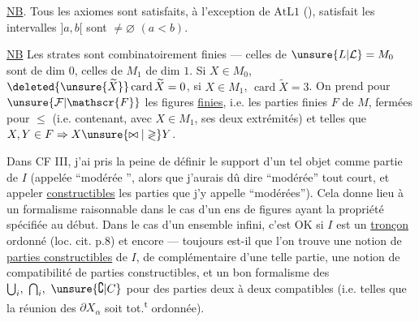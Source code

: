 \uline{NB}. Tous les axiomes sont satisfaits, à l'exception de $\mathrm{AtL1}$ (), satisfait  les intervalles $]a,b[$ sont $\ne\varnothing$ $(a<b)$.


\uline{NB} Les strates sont combinatoirement finies --- celles de $\unsure{L|\mathcal{L}}=M_0$ sont de dim $0$, celles de $M_1$ de dim $1$. Si $X\in M_0$, $\deleted{\unsure{\widetilde{X}}}\operatorname{card}\widetilde{X}=0$, si $X\in M_1$, $\operatorname{card}\widetilde{X}=3$. On prend pour $\unsure{\mathcal{F}|\mathscr{F}}$ les figures \uline{finies}, i.e. les parties finies $F$ de $M$,  fermées pour $\leq$ (i.e. contenant, avec  $X\in M_1$, ses deux extrémités) et telles que $X,Y\in F\Rightarrow X\unsure{\bowtie|\gtrless}Y$.



Dans CF III, j'ai pris la peine  de définir le support d'un tel objet comme partie de $I$ (appelée  ``modérée '', alors que j'aurais dû dire ``modérée'' tout court, et appeler \uline{constructibles} les parties que j'y appelle ``modérées''). Cela donne lieu à un formalisme raisonnable dans le cas  d'un ens  de figures ayant la propriété spécifiée au début. Dans le cas d'un ensemble infini, c'est OK si $I$ est un \uline{tronçon} ordonné (loc. cit. p.8) et encore --- toujours est-il que l'on trouve une notion de \uline{parties constructibles} de $I$, de complémentaire d'une telle partie,  une notion de compatibilité de parties constructibles, et un bon formalisme des $\bigcup_i,\ \bigcap_i,\ \unsure{\complement|C}$ pour des parties   deux à deux  compatibles (i.e. telles que la réunion des $\partial X_\alpha$ soit tot.\textsuperscript{t} ordonnée).

